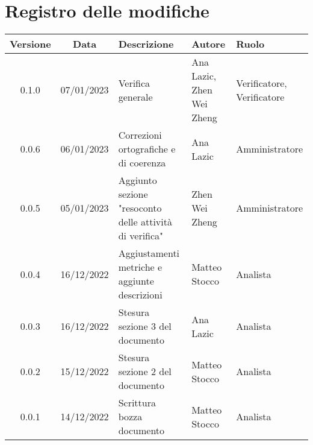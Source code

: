 \section*{Registro delle modifiche}
\begin{table}[H]
	\renewcommand\tabularxcolumn[1]{>{\Centering}m{#1}}
	\begin{tabularx}{\textwidth}{| c | c | X | X | X |} 
	\hline
	\textbf{Versione} & \textbf{Data} & \textbf{Descrizione} & \textbf{Autore} & \textbf{Ruolo}\\
    \hline
	0.1.0 & 07/01/2023 & Verifica generale & Ana Lazic, Zhen Wei Zheng & Verificatore, Verificatore \\
    \hline
	0.0.6 & 06/01/2023 & Correzioni ortografiche e di coerenza & Ana Lazic & Amministratore \\
 \hline
	0.0.5 & 05/01/2023 & Aggiunto sezione "resoconto delle attività di verifica" & Zhen Wei Zheng & Amministratore \\
	\hline
	0.0.4 & 16/12/2022 & Aggiustamenti metriche e aggiunte descrizioni & Matteo Stocco & Analista \\
     \hline
	0.0.3 & 16/12/2022 & Stesura sezione 3 del documento & Ana Lazic & Analista \\
	\hline
	0.0.2 & 15/12/2022 & Stesura sezione 2 del documento & Matteo Stocco & Analista \\
	\hline
	0.0.1 & 14/12/2022 & Scrittura bozza documento & Matteo Stocco & Analista \\
	\hline
	\end{tabularx}
\end{table}
